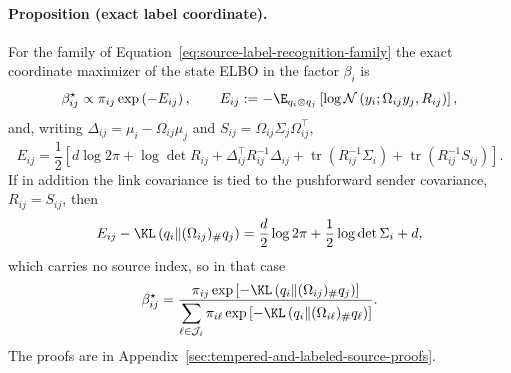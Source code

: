 \paragraph{Proposition (exact label coordinate).}
\label{prop:exact-label-coordinate}
For the family of Equation~\eqref{eq:source-label-recognition-family} the exact coordinate maximizer of the state ELBO in the factor \(\beta_i\) is
\begin{equation}
\beta_{ij}^\star\propto\pi_{ij}\exp\left(-E_{ij}\right),
\qquad
E_{ij}:=-\E_{q_i\otimes q_j}\left[\log\mathcal N\left(y_i;\Omega_{ij}y_j,R_{ij}\right)\right],
\label{eq:source-label-row-optimum}
\end{equation}
and, writing \(\Delta_{ij}=\mu_i-\Omega_{ij}\mu_j\) and \(S_{ij}=\Omega_{ij}\Sigma_j\Omega_{ij}^\top\),
\begin{equation}
E_{ij}
=\frac12\left[
d\log 2\pi
+\log\det R_{ij}
+\Delta_{ij}^\top R_{ij}^{-1}\Delta_{ij}
+\operatorname{tr}\left(R_{ij}^{-1}\Sigma_i\right)
+\operatorname{tr}\left(R_{ij}^{-1}S_{ij}\right)
\right].
\label{eq:source-label-edge-energy}
\end{equation}
If in addition the link covariance is tied to the pushforward sender covariance, \(R_{ij}=S_{ij}\), then
\begin{equation}
E_{ij}-\KL\left(q_i\middle\Vert(\Omega_{ij})_{\#}q_j\right)
=\frac d2\log 2\pi+\frac12\log\det\Sigma_i+d,
\label{eq:source-label-tied-offset}
\end{equation}
which carries no source index, so in that case
\begin{equation}
\beta_{ij}^\star
=\frac{\pi_{ij}\exp\left[-\KL\left(q_i\middle\Vert(\Omega_{ij})_{\#}q_j\right)\right]}
{\displaystyle\sum_{\ell\in\mathcal J_i}
\pi_{i\ell}\exp\left[-\KL\left(q_i\middle\Vert(\Omega_{i\ell})_{\#}q_\ell\right)\right]}.
\label{eq:source-label-tied-row}
\end{equation}
The proofs are in Appendix~\ref{sec:tempered-and-labeled-source-proofs}.


